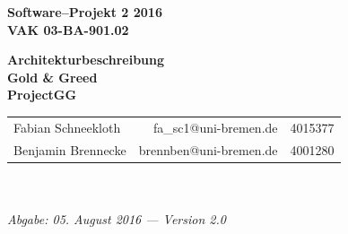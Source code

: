 \documentclass[fontsize=12pt,paper=a4,twoside]{scrartcl}
\begin{document}
  \thispagestyle{fancy}
  \fancyhead[LO,RE]{ }
  \fancyfoot[C]{}

  \vspace{3cm}

  \begin{minipage}[H]{\textwidth}
  \begin{center}
  \bfseries
  \Large
  Software--Projekt 2 2016\\
  \smallskip
  \small
  VAK 03-BA-901.02\\
  \vspace{3cm}
  \end{center}
  \end{minipage}
  \begin{minipage}[H]{\textwidth}
  \begin{center}
  \vspace{1cm}
  \bfseries
  \Large Architekturbeschreibung\\
\Huge Gold \& Greed\\
\Large ProjectGG


  \vfill
  \end{center}
  \end{minipage}
  \vfill
  \begin{minipage}[H]{\textwidth}
  \begin{center}
  \sffamily
  \begin{tabular}{lrr}
  Fabian Schneekloth & fa\_sc1@uni-bremen.de & 4015377\\
  Benjamin Brennecke & brennben@uni-bremen.de & 4001280\\
  \end{tabular}
  \\ ~
  \vspace{2cm}
  \\
  \itshape Abgabe: 05. August 2016 --- Version 2.0\\ ~
  \end{center}
  \end{minipage}



\newpage

  \thispagestyle{fancy}
  \fancyhead{}
  \fancyfoot{}
  \renewcommand{\headrulewidth}{0.4pt}
  \tableofcontents
\end{document}
